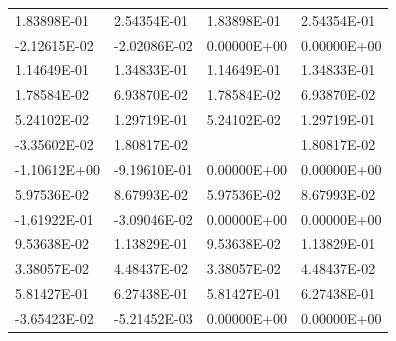 \begin{longtable}{llll}
    1.83898E-01                        & 2.54354E-01                        & 1.83898E-01                                                 & 2.54354E-01          \\
    -2.12615E-02                       & -2.02086E-02                       & 0.00000E+00                                                 & 0.00000E+00          \\
    1.14649E-01                        & 1.34833E-01                        & 1.14649E-01                                                 & 1.34833E-01          \\
    1.78584E-02                        & 6.93870E-02                        & 1.78584E-02                                                 & 6.93870E-02          \\
    5.24102E-02                        & 1.29719E-01                        & 5.24102E-02                                                 & 1.29719E-01          \\
    -3.35602E-02                       & 1.80817E-02                        & \cellcolor[HTML]{FFC7CE}{\color[HTML]{9C0006} -5.55112E-17} & 1.80817E-02          \\
    -1.10612E+00                       & -9.19610E-01                       & 0.00000E+00                                                 & 0.00000E+00          \\
    5.97536E-02                        & 8.67993E-02                        & 5.97536E-02                                                 & 8.67993E-02          \\
    -1.61922E-01                       & -3.09046E-02                       & 0.00000E+00                                                 & 0.00000E+00          \\
    9.53638E-02                        & 1.13829E-01                        & 9.53638E-02                                                 & 1.13829E-01          \\
    3.38057E-02                        & 4.48437E-02                        & 3.38057E-02                                                 & 4.48437E-02          \\
    5.81427E-01                        & 6.27438E-01                        & 5.81427E-01                                                 & 6.27438E-01          \\
    -3.65423E-02                       & -5.21452E-03                       & 0.00000E+00                                                 & 0.00000E+00          \\

\end{longtable}
